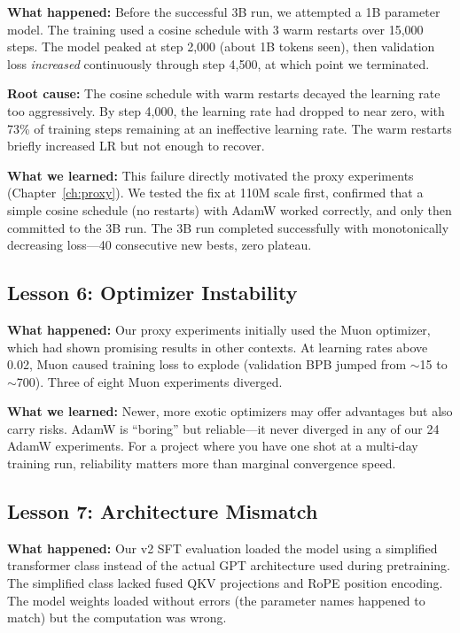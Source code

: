 \documentclass[11pt,a4paper]{article}
\begin{document}
\textbf{What happened:} Before the successful 3B run, we attempted a 1B parameter model. The training used a cosine schedule with 3 warm restarts over 15,000 steps. The model peaked at step 2,000 (about 1B tokens seen), then validation loss \emph{increased} continuously through step 4,500, at which point we terminated.

\textbf{Root cause:} The cosine schedule with warm restarts decayed the learning rate too aggressively. By step 4,000, the learning rate had dropped to near zero, with 73\% of training steps remaining at an ineffective learning rate. The warm restarts briefly increased LR but not enough to recover.

\textbf{What we learned:} This failure directly motivated the proxy experiments (Chapter~\ref{ch:proxy}). We tested the fix at 110M scale first, confirmed that a simple cosine schedule (no restarts) with AdamW worked correctly, and only then committed to the 3B run. The 3B run completed successfully with monotonically decreasing loss---40 consecutive new bests, zero plateau.

\subsection{Lesson 6: Optimizer Instability}

\textbf{What happened:} Our proxy experiments initially used the Muon optimizer, which had shown promising results in other contexts. At learning rates above 0.02, Muon caused training loss to explode (validation BPB jumped from $\sim$15 to $\sim$700). Three of eight Muon experiments diverged.

\textbf{What we learned:} Newer, more exotic optimizers may offer advantages but also carry risks. AdamW is ``boring'' but reliable---it never diverged in any of our 24 AdamW experiments. For a project where you have one shot at a multi-day training run, reliability matters more than marginal convergence speed.

\subsection{Lesson 7: Architecture Mismatch}

\textbf{What happened:} Our v2 SFT evaluation loaded the model using a simplified transformer class instead of the actual GPT architecture used during pretraining. The simplified class lacked fused QKV projections and RoPE position encoding. The model weights loaded without errors (the parameter names happened to match) but the computation was wrong.
\end{document}

